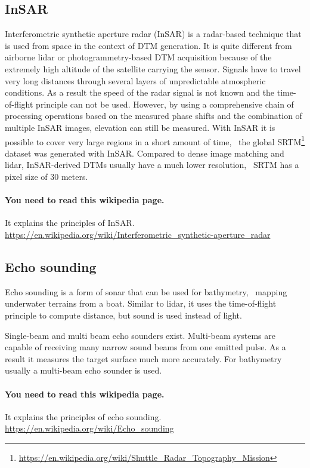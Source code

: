 \subsection{InSAR}
Interferometric synthetic aperture radar (InSAR) is a radar-based technique that is used from space in the context of DTM generation. 
It is quite different from airborne lidar or photo\-gramme\-try-based DTM acquisition because of the extremely high altitude of the satellite carrying the sensor. 
Signals have to travel very long distances through several layers of unpredictable atmospheric conditions. 
As a result the speed of the radar signal is not known and the time-of-flight principle can not be used. 
However, by using a comprehensive chain of processing operations based on the measured phase shifts and the combination of multiple InSAR images, elevation can still be measured. 
With InSAR it is possible to cover very large regions in a short amount of time, \eg\ the global SRTM\footnote{\url{https://en.wikipedia.org/wiki/Shuttle_Radar_Topography_Mission}} dataset was generated with InSAR\@. 
Compared to dense image matching and lidar, InSAR-derived DTMs usually have a much lower resolution, \eg\ SRTM has a pixel size of 30 meters.
\begin{practical-stuff}
	\paragraph{You need to read this wikipedia page.}
	It explains the principles of InSAR\@.
	\\
	\url{https://en.wikipedia.org/wiki/Interferometric_synthetic-aperture_radar}
\end{practical-stuff}

\subsection{Echo sounding}
Echo sounding is a form of sonar that can be used for bathymetry, \ie\ mapping underwater terrains from a boat. 
Similar to lidar, it uses the time-of-flight principle to compute distance, but sound is used instead of light. 

Single-beam and multi beam echo sounders exist. Multi-beam systems are capable of receiving many narrow sound beams from one emitted pulse. As a result it measures the target surface much more accurately. 
For bathymetry usually a multi-beam echo sounder is used.

\begin{practical-stuff}
  \paragraph{You need to read this wikipedia page.}
  It explains the principles of echo sounding.
  \\
  \url{https://en.wikipedia.org/wiki/Echo_sounding}
\end{practical-stuff}




